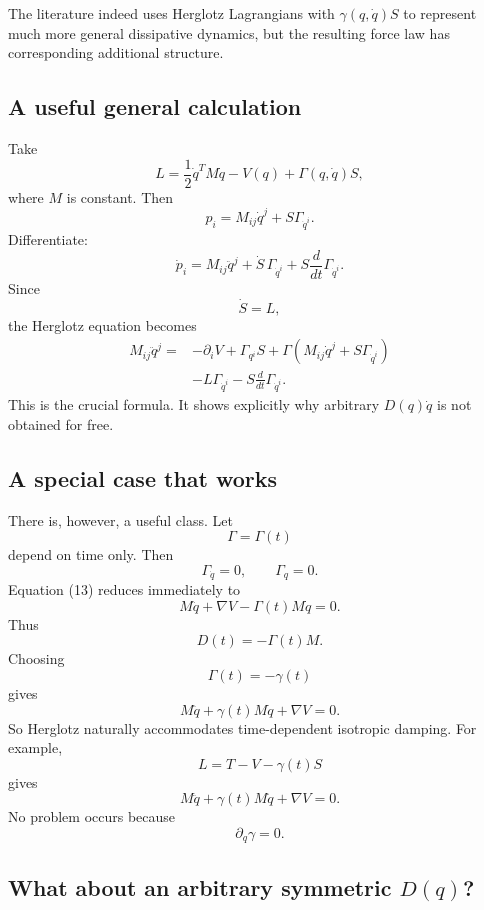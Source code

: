 The literature indeed uses Herglotz Lagrangians with \(\gamma(q,\dot q)S\) to represent much more general dissipative dynamics, but the resulting force law has corresponding additional structure.

\subsection{A useful general calculation}

Take
\begin{equation}
 \boxed{ L= \frac12\dot q^TM\dot q -V(q) + \Gamma(q,\dot q)S, } \tag{12} 
\end{equation}
where \(M\) is constant.
Then
$$ p_i = M_{ij}\dot q^j + S\Gamma_{\dot q^i}. $$
Differentiate:
$$ \dot p_i = M_{ij}\ddot q^j + \dot S\,\Gamma_{\dot q^i} + S\frac{d}{dt}\Gamma_{\dot q^i}. $$
Since
$$ \dot S=L, $$
the Herglotz equation becomes
\begin{equation}
 \begin{aligned} M_{ij}\ddot q^j ={}& -\partial_iV +\Gamma_{q^i}S +\Gamma \left( M_{ij}\dot q^j+ S\Gamma_{\dot q^i} \right) \\ &- L\Gamma_{\dot q^i} - S\frac{d}{dt}\Gamma_{\dot q^i}. \end{aligned} \tag{13} 
\end{equation}
This is the crucial formula.
It shows explicitly why arbitrary \(D(q)\dot q\) is not obtained for free.

\subsection{A special case that works}

There is, however, a useful class.
Let
$$ \Gamma=\Gamma(t) $$
depend on time only.
Then
$$ \Gamma_{\dot q}=0, \qquad \Gamma_q=0. $$
Equation (13) reduces immediately to
$$ M\ddot q+\nabla V-\Gamma(t)M\dot q=0. $$
Thus
$$ \boxed{ D(t)=-\Gamma(t)M. } $$
Choosing
$$ \Gamma(t)=-\gamma(t) $$
gives
$$ \boxed{ M\ddot q+\gamma(t)M\dot q+\nabla V=0. } $$
So Herglotz naturally accommodates time-dependent isotropic damping.
For example,
$$ L= T-V-\gamma(t)S $$
gives
$$ M\ddot q+\gamma(t)M\dot q+\nabla V=0. $$
No problem occurs because
$$ \partial_q\gamma=0. $$

\subsection{What about an arbitrary symmetric \(D(q)\)?}

